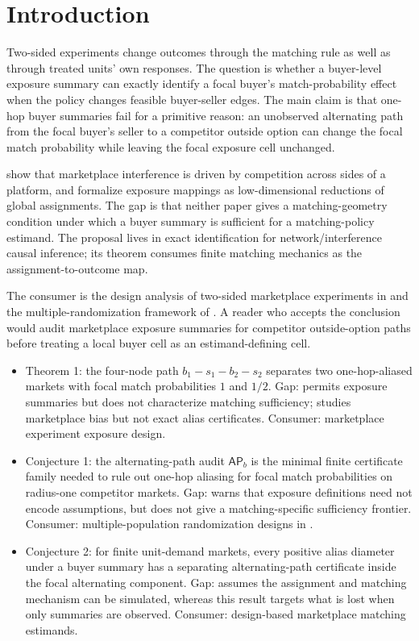 \documentclass[11pt]{article}
\theoremstyle{definition}
\theoremstyle{plain}
\theoremstyle{remark}
\begin{document}
\section{Introduction}
Two-sided experiments change outcomes through the matching rule as well as through treated units' own responses.  The question is whether a buyer-level exposure summary can exactly identify a focal buyer's match-probability effect when the policy changes feasible buyer-seller edges.  The main claim is that one-hop buyer summaries fail for a primitive reason: an unobserved alternating path from the focal buyer's seller to a competitor outside option can change the focal match probability while leaving the focal exposure cell unchanged.

\citet[p.~483]{JohariLiLiskovichWeintraub2022} show that marketplace interference is driven by competition across sides of a platform, and \citet[Sec.~2]{AronowSamii2017} formalize exposure mappings as low-dimensional reductions of global assignments.  The gap is that neither paper gives a matching-geometry condition under which a buyer summary is sufficient for a matching-policy estimand.  The proposal lives in exact identification for network/interference causal inference; its theorem consumes finite matching mechanics as the assignment-to-outcome map.

The consumer is the design analysis of two-sided marketplace experiments in \citet{JohariLiLiskovichWeintraub2022} and the multiple-randomization framework of \citet{MasoeroVijaykumarRichardsonMcQueenRosenBurdickBajariImbens2026}.  A reader who accepts the conclusion would audit marketplace exposure summaries for competitor outside-option paths before treating a local buyer cell as an estimand-defining cell.

\begin{itemize}[leftmargin=*]
\item Theorem 1: the four-node path \(b_1-s_1-b_2-s_2\) separates two one-hop-aliased markets with focal match probabilities \(1\) and \(1/2\). Gap: \citet{AronowSamii2017} permits exposure summaries but does not characterize matching sufficiency; \citet{JohariLiLiskovichWeintraub2022} studies marketplace bias but not exact alias certificates. Consumer: marketplace experiment exposure design.
\item Conjecture 1: the alternating-path audit \(\mathsf{AP}_b\) is the minimal finite certificate family needed to rule out one-hop aliasing for focal match probabilities on radius-one competitor markets. Gap: \citet{Savje2024} warns that exposure definitions need not encode assumptions, but does not give a matching-specific sufficiency frontier. Consumer: multiple-population randomization designs in \citet{MasoeroVijaykumarRichardsonMcQueenRosenBurdickBajariImbens2026}.
\item Conjecture 2: for finite unit-demand markets, every positive alias diameter under a buyer summary has a separating alternating-path certificate inside the focal alternating component. Gap: \citet{Chen2019} assumes the assignment and matching mechanism can be simulated, whereas this result targets what is lost when only summaries are observed. Consumer: design-based marketplace matching estimands.
\end{itemize}
\end{document}
